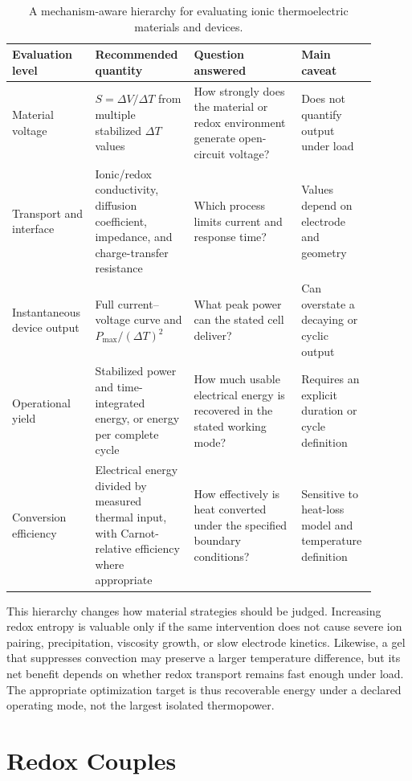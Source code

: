 \begin{table}[H]
\centering
\caption{A mechanism-aware hierarchy for evaluating ionic thermoelectric
materials and devices.}
\footnotesize
\begin{tabular}{>{\raggedright\arraybackslash}p{0.19\linewidth}
>{\raggedright\arraybackslash}p{0.25\linewidth}
>{\raggedright\arraybackslash}p{0.28\linewidth}
>{\raggedright\arraybackslash}p{0.18\linewidth}}
\toprule
Evaluation level & Recommended quantity & Question answered & Main caveat \\
\midrule
Material voltage & $S=\Delta V/\Delta T$ from multiple stabilized
$\Delta T$ values & How strongly does the material or redox environment
generate open-circuit voltage? & Does not quantify output under load \\
Transport and interface & Ionic/redox conductivity, diffusion coefficient,
impedance, and charge-transfer resistance & Which process limits current and
response time? & Values depend on electrode and geometry \\
Instantaneous device output & Full current--voltage curve and
$P_{\max}/(\Delta T)^2$ & What peak power can the stated cell deliver? &
Can overstate a decaying or cyclic output \\
Operational yield & Stabilized power and time-integrated energy, or energy per
complete cycle & How much usable electrical energy is recovered in the stated
working mode? & Requires an explicit duration or cycle definition \\
Conversion efficiency & Electrical energy divided by measured thermal input,
with Carnot-relative efficiency where appropriate & How effectively is heat
converted under the specified boundary conditions? & Sensitive to heat-loss
model and temperature definition \\
\bottomrule
\end{tabular}
\end{table}

This hierarchy changes how material strategies should be judged. Increasing
redox entropy is valuable only if the same intervention does not cause severe
ion pairing, precipitation, viscosity growth, or slow electrode kinetics.
Likewise, a gel that suppresses convection may preserve a larger temperature
difference, but its net benefit depends on whether redox transport remains fast
enough under load. The appropriate optimization target is thus recoverable
energy under a declared operating mode, not the largest isolated thermopower.

\section{Redox Couples}

